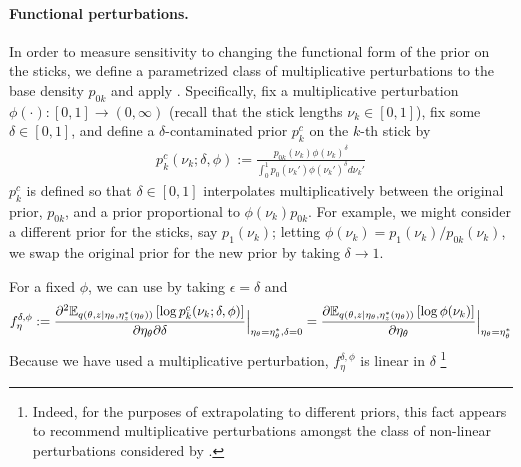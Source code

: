

\paragraph{Functional perturbations.}
%
In order to measure sensitivity to changing the functional form of the prior on
the sticks, we define a parametrized class of multiplicative perturbations to
the base density $p_{0k}$ and apply .
Specifically, fix a multiplicative perturbation $\phi(\cdot): [0, 1] \rightarrow
(0, \infty)$  (recall that the stick lengths $\nu_k\in[0, 1]$), fix
some $\delta\in[0, 1]$, and define
a $\delta$-contaminated prior $p^c_{k}$ on the $k$-th stick by
%
\begin{align}
\label{eq:expon_perturb}
	p^c_{k}(\nu_k ; \delta, \phi) :=
  \frac{p_{0k}(\nu_k)\phi(\nu_k)^\delta}
       {\int_0^1 p_0(\nu_k')\phi(\nu_k')^\delta d\nu_k'}
\end{align}
%
$p^c_{k}$ is defined so that $\delta\in[0, 1]$ interpolates multiplicatively
between the original prior, $p_{0k}$, and a prior proportional to
$\phi(\nu_k)p_{0k}$. For example, we might consider a different prior for the
sticks, say $p_1(\nu_k)$; letting $\phi(\nu_k) = p_1(\nu_k) / p_{0k}(\nu_k)$, we
swap the original prior for the new prior by taking $\delta \rightarrow 1$.

For a fixed $\phi$, we can use  by taking
$\epsilon = \delta$ and
%
\begin{align*}
f^{\delta,\phi}_\eta :=
\frac{\partial^2
    \mathbb{E}_{q\left(\theta, z \vert \eta_\theta, \eta_z^{*}(\eta_\theta)\right)} \left[ \log p^c_{k}(\nu_k ; \delta, \phi) \right]}
{\partial \eta_\theta \partial \delta}
    \Big\rvert_{\eta_\theta = \eta_\theta^{*}, \delta = 0} =
\frac{\partial
    \mathbb{E}_{q\left(\theta, z \vert \eta_\theta, \eta_z^{*}(\eta_\theta)\right)} \left[ \log\phi(\nu_k) \right]}
{\partial \eta_\theta}
    \Big\rvert_{\eta_\theta = \eta_\theta^{*}}
\end{align*}
%
Because we have used a multiplicative perturbation, $f^{\delta,\phi}_\eta$
is linear in $\delta$
%
\footnote{Indeed, for the purposes of extrapolating to different priors, this
fact appears to recommend multiplicative perturbations amongst the class of
non-linear perturbations considered by \citet{gustafson:1996:localposterior}.}


